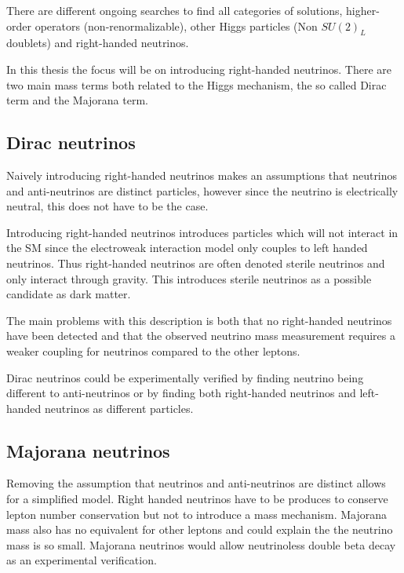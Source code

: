 There are different ongoing searches to find all categories of solutions, higher-order operators (non-renormalizable), other Higgs particles (Non $SU(2)_L $ doublets) and right-handed neutrinos.

In this thesis the focus will be on introducing right-handed neutrinos. There are two main mass terms both related to the Higgs mechanism, the so called Dirac term and the Majorana term.

\subsection{Dirac neutrinos}
Naively introducing right-handed neutrinos makes an assumptions that neutrinos and anti-neutrinos are distinct particles, however since the neutrino is electrically neutral, this does not have to be the case.
 
Introducing right-handed neutrinos introduces particles which will not interact in the SM since the electroweak interaction model only couples to left handed neutrinos. Thus right-handed neutrinos are often denoted sterile neutrinos and only interact through gravity. This introduces sterile neutrinos as a possible candidate as dark matter. \cite{SterileDark, SUSYdark}

The main problems with this description is both that no right-handed neutrinos have been detected and that the observed neutrino mass measurement requires a weaker coupling for neutrinos compared to the other leptons.

Dirac neutrinos could be experimentally verified by finding neutrino being different to anti-neutrinos or by finding both right-handed neutrinos and left-handed neutrinos as different particles.

\subsection{Majorana neutrinos}
Removing the assumption that neutrinos and anti-neutrinos are distinct allows for a simplified model. Right handed neutrinos have to be produces to conserve lepton number conservation but not to introduce a mass mechanism. Majorana mass also has no equivalent for other leptons and could explain the the neutrino mass is so small. Majorana neutrinos would allow neutrinoless double beta decay\cite{NeuLess} as an experimental verification.


%
